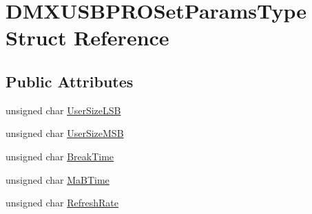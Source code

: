\hypertarget{struct_d_m_x_u_s_b_p_r_o_set_params_type}{\section{D\-M\-X\-U\-S\-B\-P\-R\-O\-Set\-Params\-Type Struct Reference}
\label{struct_d_m_x_u_s_b_p_r_o_set_params_type}
}
\subsection*{Public Attributes}
\begin{DoxyCompactItemize}
\item 
unsigned char \hyperlink{struct_d_m_x_u_s_b_p_r_o_set_params_type_a849e4ebeb6ebb38a6b2fc53c32d4456d}{User\-Size\-L\-S\-B}
\item 
unsigned char \hyperlink{struct_d_m_x_u_s_b_p_r_o_set_params_type_adae7671559ec6924d03fd27f50d6fda0}{User\-Size\-M\-S\-B}
\item 
unsigned char \hyperlink{struct_d_m_x_u_s_b_p_r_o_set_params_type_ad5a0ccbc024303300f2933f16046abd4}{Break\-Time}
\item 
unsigned char \hyperlink{struct_d_m_x_u_s_b_p_r_o_set_params_type_a766ed7ac1cd093a822fa905f43f81129}{Ma\-B\-Time}
\item 
unsigned char \hyperlink{struct_d_m_x_u_s_b_p_r_o_set_params_type_a1e0b6924aa027f23f1bbd5606cbe09e7}{Refresh\-Rate}
\end{DoxyCompactItemize}


